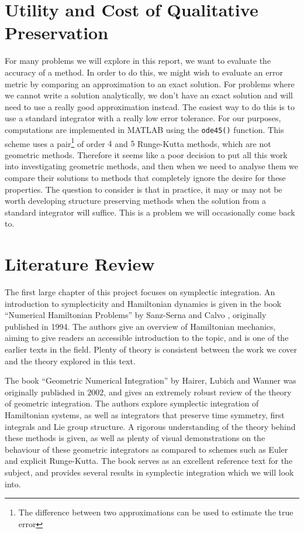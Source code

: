 \section{Utility and Cost of Qualitative Preservation}


For many problems we will explore in this report, we want to evaluate the accuracy of a method.
In order to do this, we might wish to evaluate an error metric by comparing an approximation to an exact solution.
For problems where we cannot write a solution analytically, we don't have an exact solution and will need to use a really good approximation instead.
The easiest way to do this is to use a standard integrator with a really low error tolerance.
For our purposes, computations are implemented in MATLAB using the \texttt{ode45()} function.
This scheme uses a pair\footnote{
    The difference between two approximations can be used to estimate the true error
} of order $4$ and $5$ Runge-Kutta methods, which are not geometric methods.
Therefore it seems like a poor decision to put all this work into investigating geometric methods,
and then when we need to analyse them we compare their solutions to methods that completely ignore the desire for these properties.
The question to consider is that in practice, it may or may not be worth developing structure preserving methods when the solution from a standard integrator will suffice.
This is a problem we will occasionally come back to.

\section{Literature Review}

The first large chapter of this project focuses on symplectic integration.
An introduction to symplecticity and Hamiltonian dynamics is given in the book ``Numerical Hamiltonian Problems'' by Sanz-Serna and Calvo \cite{sanz2018hamiltonian}, originally published in 1994.
The authors give an overview of Hamiltonian mechanics, aiming to give readers an accessible introduction to the topic, and is one of the earlier texts in the field.
Plenty of theory is consistent between the work we cover and the theory explored in this text.

The book ``Geometric Numerical Integration'' by Hairer, Lubich and Wanner \cite{gni2006} was originally published in $2002$, and gives an extremely robust review of the theory of geometric integration.
The authors explore symplectic integration of Hamiltonian systems, as well as integrators that preserve time symmetry, first integrals and Lie group structure.
A rigorous understanding of the theory behind these methods is given, as well as plenty of visual demonstrations on the behaviour of these geometric integrators as compared to schemes such as Euler and explicit Runge-Kutta.
The book serves as an excellent reference text for the subject, and provides several results in symplectic integration which we will look into.


